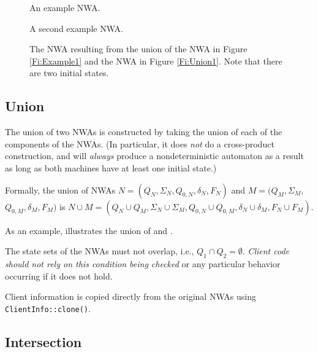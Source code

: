 \begin{figure}[tb]
  \centering
  \begin{minipage}{0.3\textwidth}
    \centering
    \caption{An example NWA.}
    \label{Fi:Example1}
  \end{minipage}
  \hspace{0.025\textwidth}
  \begin{minipage}{0.3\textwidth}
    \centering
    \caption{A second example NWA.}
    \label{Fi:Union1}
  \end{minipage}
  \hspace{0.025\textwidth}
  \begin{minipage}{0.3\textwidth}
    \centering
    \caption{The NWA resulting from the union of the NWA in Figure
      \ref{Fi:Example1} and the NWA in Figure \ref{Fi:Union1}. Note that there
      are two initial states.}
    \label{Fi:Union2}
  \end{minipage}
\end{figure}




\subsection{Union}
\label{Se:Union}
The union of two NWAs is constructed by taking the union of each of the
components of the NWAs. (In
particular, it does \textsl{not} do a cross-product construction, and will
\textsl{always} produce a nondeterministic automaton as a result as long as
both machines have at least one initial state.)

Formally, the union of NWAs $N = (Q_N, \Sigma_N, Q_{0,N}, \delta_N, F_N)$
and $M = (Q_M, \Sigma_M,$ $Q_{0,M}, \delta_M, F_M)$ is
$N \cup M = (Q_N \cup Q_M, \Sigma_N \cup \Sigma_M, Q_{0,N} \cup
   Q_{0,M}, \delta_N \cup \delta_M, F_N \cup F_M)$.

As an example,  illustrates the union of  and
.


The state sets of the NWAs must not overlap,
i.e., $Q_1 \cap Q_2 = \emptyset$. \textsl{Client code should not rely on
  this condition being checked} or any particular behavior occurring if it
does not hold.

Client information is copied directly from the original NWAs using
\texttt{ClientInfo::clone()}.


\subsection{Intersection}
\label{Se:Intersection}

